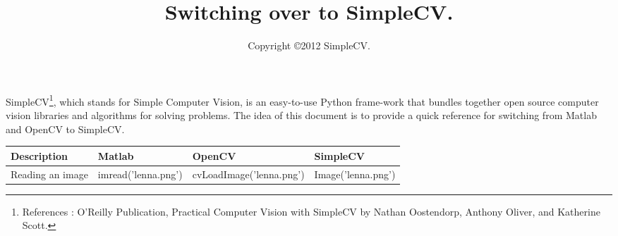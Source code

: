 \documentclass[a4paper,landscape,10pt]{article}
\title{Switching over to SimpleCV.}
\author{Copyright \copyright 2012 SimpleCV.\\}
\begin{document}
\maketitle

SimpleCV\footnote{References : O'Reilly Publication, Practical Computer Vision with SimpleCV by Nathan Oostendorp, Anthony Oliver, and Katherine Scott.}, which stands for Simple Computer Vision, is an easy-to-use Python frame-work that bundles together open source computer vision libraries and algorithms for solving problems. The idea of this document is to provide a quick reference for switching from Matlab and OpenCV to SimpleCV. 
\begin{center}

\begin{tabular}{p{4.7cm} p{4.7cm} p{4.7cm} p{4.7cm}}
  \hline
  Description & Matlab & OpenCV & SimpleCV \\ \hline
  Reading an image & imread('lenna.png')  & cvLoadImage('lenna.png') & Image('lenna.png')\\ 
\end{tabular}
 
\end{center}
\end{document}
